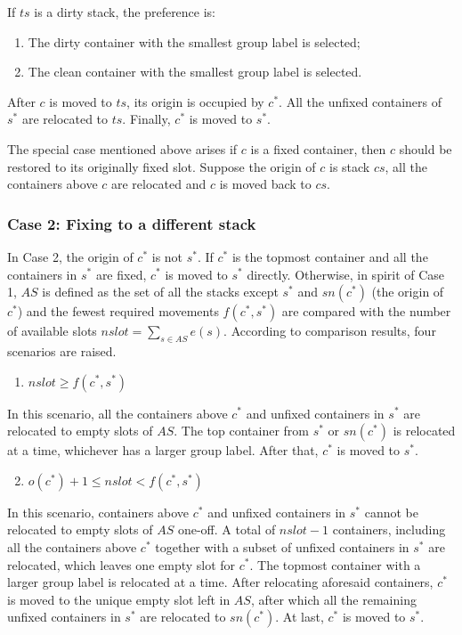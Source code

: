 \documentclass[review,3p,times,authoryear,12pt]{elsarticle}
\begin{document}
If $\mathit{ts}$ is a dirty stack, the preference is:
\begin{enumerate}[1.]
\item The dirty container with the smallest group label is selected;
\item The clean container with the smallest group label is selected.
\end{enumerate}

After $c$ is moved to $\mathit{ts}$, its origin is occupied by $c^*$. 
All the unfixed containers of $s^*$ are relocated to $\mathit{ts}$. 
Finally, $c^*$ is moved to $s^*$. 

The special case mentioned above arises if $c$ is a fixed container, then $c$ should be restored to its originally fixed slot. 
Suppose the origin of $c$ is stack $\mathit{cs}$, all the containers above $c$ are relocated and $c$ is moved back to $\mathit{cs}$.

\subsubsection{Case 2: Fixing to a different stack}

In Case 2, the origin of $c^*$ is not $s^*$. 
If $c^*$ is the topmost container and all the containers in $s^*$ are fixed, $c^*$ is moved to $s^*$ directly. 
Otherwise, in spirit of Case 1, $\mathit{AS}$ is defined as the set of all the stacks except $s^*$ and $\mathit{sn}(c^*)$ (the origin of $c^*$) and the fewest required movements $f(c^*,s^*)$ are compared with the number of available slots $\mathit{nslot}=\sum_{s\in \mathit{AS}}e(s)$. 
According to comparison results, four scenarios are raised.

\begin{enumerate}
\setcounter{enumi}{0}
\item $\mathit{nslot}\ge f(c^*,s^*)$
\end{enumerate}

In this scenario, all the containers above $c^*$ and unfixed containers in $s^*$ are relocated to empty slots of $\mathit{AS}$. The top container from $s^*$ or $\mathit{sn}(c^*)$ is relocated at a time, whichever has a larger group label. After that, $c^*$ is moved to $s^*$.

\begin{enumerate}
\setcounter{enumi}{1}
\item $o(c^*)+1\le\mathit{nslot}< f(c^*,s^*)$
\end{enumerate}

In this scenario, containers above $c^*$ and unfixed containers in $s^*$ cannot be relocated to empty slots of $\mathit{AS}$ one-off. 
A total of $\mathit{nslot}-1$ containers, including all the containers above $c^*$ together with a subset of unfixed containers in $s^*$ are relocated, which leaves one empty slot for $c^*$. 
The topmost container with a larger group label is relocated at a time. 
After relocating aforesaid containers, $c^*$ is moved to the unique empty slot left in $\mathit{AS}$, after which all the remaining unfixed containers in $s^*$ are relocated to $\mathit{sn}(c^*)$. 
At last, $c^*$ is moved to $s^*$.
\end{document}

